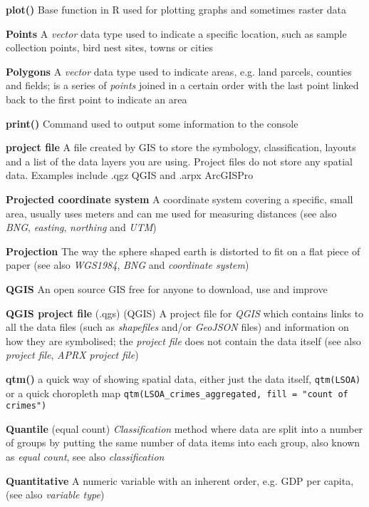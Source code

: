 \documentclass[a4paper,10pt]{article}
\begin{document}
\begin{multicols}{2}
\textbf{plot()} Base function in R used for plotting graphs and sometimes raster data

\textbf{Points} A \textit{vector} data type used to indicate a specific location, such as sample collection points, bird nest sites, towns or cities

\textbf{Polygons} A \textit{vector} data type used to indicate areas, e.g. land parcels, counties and fields; is a series of \textit{points} joined in a certain order with the last point linked back to the first point to indicate an area

\textbf{print()} Command used to output some information to the console

\textbf{project file} A file created by GIS to store the symbology, classification, layouts and a list of the data layers you are using. Project files do not store any spatial data. Examples include .qgz QGIS and .arpx ArcGISPro

\textbf{Projected coordinate system} A coordinate system covering a specific, small area, usually uses meters and can me used for measuring distances (see also \textit{BNG}, \textit{easting}, \textit{northing} and \textit{UTM})

\textbf{Projection} The way the sphere shaped earth is distorted to fit on a flat piece of paper (see also \textit{WGS1984}, \textit{BNG} and \textit{coordinate system})

\textbf{QGIS} An open source GIS free for anyone to download, use and improve

\textbf{QGIS project file} (.qgs) (QGIS) A project file for \textit{QGIS} which contains links to all the data files (such as \textit{shapefiles} and/or \textit{GeoJSON} files) and information on how they are symbolised; the \textit{project file} does not contain the data itself (see also \textit{project file}, \textit{APRX project file})

\textbf{qtm()} a quick way of showing spatial data, either just the data itself, \texttt{qtm(LSOA)} or a quick choropleth map \texttt{qtm(LSOA\_crimes\_aggregated, fill = "count of crimes")}

\textbf{Quantile} (equal count) \textit{Classification} method where data are split into a number of groups by putting the same number of data items into each group, also known as \textit{equal count}, see also \textit{classification}

\textbf{Quantitative} A numeric variable with an inherent order, e.g. GDP per capita, (see also \textit{variable type})


\end{multicols}
\end{document}
